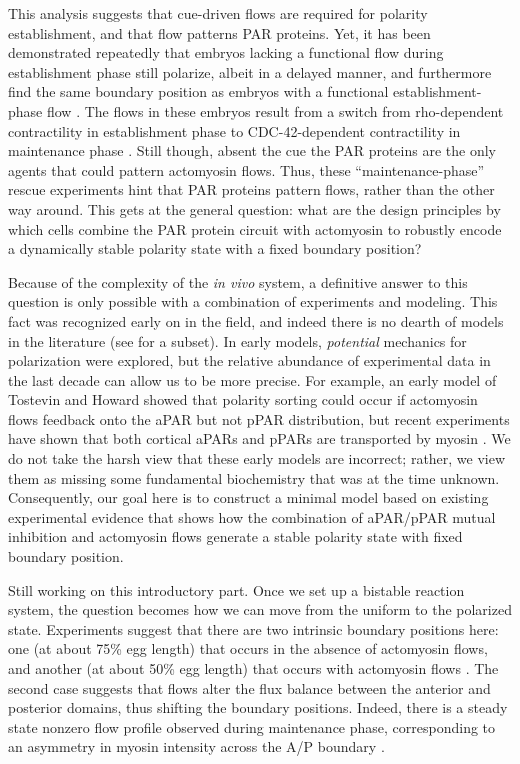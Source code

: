 \documentclass[11pt]{article}
\newcommand{\red}[1]{\color{red}#1\normalcolor}
\newcommand{\6}[1]{#1_{\text{6}}}
\newcommand{\3}[1]{#1_{\text{3}}}
\begin{document}
This analysis suggests that cue-driven flows are required for polarity establishment, and that flow patterns PAR proteins. Yet, it has been demonstrated repeatedly that embryos lacking a functional flow during establishment phase still polarize, albeit in a delayed manner, and furthermore find the same boundary position as embryos with a functional establishment-phase flow \cite{zonies2010symmetry, tse2012rhoa}. The flows in these embryos result from a switch from rho-dependent contractility in establishment phase to CDC-42-dependent contractility in maintenance phase \cite{schonegg2006cdc}. Still though, absent the cue the PAR proteins are the only agents that could pattern actomyosin flows. Thus, these ``maintenance-phase'' rescue experiments hint that PAR proteins pattern flows, rather than the other way around. This gets at the general question: what are the design principles by which cells combine the PAR protein circuit with actomyosin to robustly encode a dynamically stable polarity state with a fixed boundary position?

Because of the complexity of the \emph{in vivo} system, a definitive answer to this question is only possible with a combination of experiments and modeling. This fact was recognized early on in the field, and indeed there is no dearth of models in the literature (see \cite{TH2008, dawes20113, dawes2013cortical, gessele2020geometric, gross2019guiding, goehring2011polarization, kravtsova2014actomyosin} for a subset). In early models, \emph{potential} mechanics for polarization were explored, but the relative abundance of experimental data in the last decade can allow us to be more precise. For example, an early model of Tostevin and Howard showed that polarity sorting could occur if actomyosin flows feedback onto the aPAR \cite{TH2008} but not pPAR distribution, but recent experiments have shown that both cortical aPARs and pPARs are transported by myosin \cite{illukkumbura2023design}. We do not take the harsh view that these early models are incorrect; rather, we view them as missing some fundamental biochemistry that was at the time unknown. Consequently, our goal here is to construct a minimal model based on existing experimental evidence that shows how the combination of aPAR/pPAR mutual inhibition and actomyosin flows generate a stable polarity state with fixed boundary position. 

\red{Still working on this introductory part.} Once we set up a bistable reaction system, the question becomes how we can move from the uniform to the polarized state. Experiments suggest that there are two intrinsic boundary positions here: one (at about 75\% egg length) that occurs in the absence of actomyosin flows, and another (at about 50\% egg length) that occurs with actomyosin flows \cite{zonies2010symmetry}. The second case suggests that flows alter the flux balance between the anterior and posterior domains, thus shifting the boundary positions. Indeed, there is a steady state nonzero flow profile observed during maintenance phase, corresponding to an asymmetry in myosin intensity across the A/P boundary \cite{sailer2015dynamic}.
\end{document}
